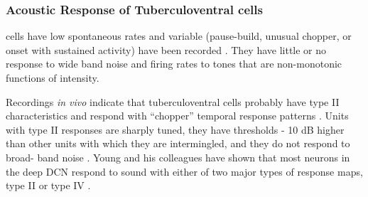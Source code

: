 


\subsubsection{Acoustic Response of Tuberculoventral cells}

\TV cells have low spontaneous rates and variable \PSTHs
(pause-build, unusual chopper, or onset with sustained activity) have been
recorded \citep{ShofnerYoung:1985,SpirouDavisEtAl:1999}. They have little or no
response to wide band noise and firing rates to \CF tones that are non-monotonic
functions of intensity.

 Recordings \textit{in vivo} indicate that tuberculoventral cells probably have type II characteristics
 and respond with  “chopper”
 temporal response patterns \citep{ZhangOertel:1993b}. Units with type II responses are sharply tuned, they
 have thresholds - 10 dB higher than other units with which
 they are intermingled, and they do not respond to broad-
 band noise \citep{SpirouDavisEtAl:1999,YoungBrownell:1976,Young:1980,SachsYoung:1980,YoungVoigt:1982,ShofnerYoung:1985,VoigtYoung:1990,YoungSpirouEtAl:1992,Rhode:1999}. Young and his colleagues have
 shown that most neurons in the deep DCN respond to
 sound with either of two major types of response maps, type
 II or type IV 
\citep{EvansNelson:1973,ShofnerYoung:1985,VoigtYoung:1980,VoigtYoung:1990,Young:1980,YoungBrownell:1976}. 

